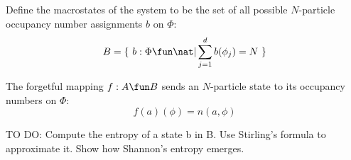\documentclass[11pt]{amsart}
\begin{document}
Define the macrostates of the system to be the set of all possible $N$-particle occupancy number assignments $b$ on $\Phi$:
\begin{equation}
	B = \{~ b: \Phi \fun \nat | \sum_{j=1}^d b(\phi_j) = N ~\}
\end{equation}

The forgetful mapping $f : A \fun B$ sends an $N$-particle state to its occupancy numbers on $\Phi$:
\begin{equation}
	f(a)(\phi) = n(a, \phi)
\end{equation}

TO DO: Compute the entropy of a state b in B. Use Stirling's formula to approximate it. Show how Shannon's entropy emerges.







 









\end{document}
